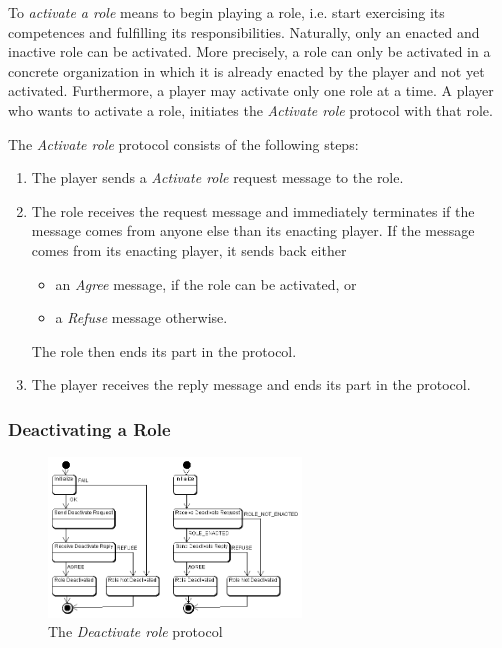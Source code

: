 To \textit{activate a role} means to begin playing a role, i.e. start exercising its competences and fulfilling its responsibilities.
Naturally, only an enacted and inactive role can be activated.
More precisely, a role can only be activated in a concrete organization in which it is already enacted by the player and not yet activated.
Furthermore, a player may activate only one role at a time.
A player who wants to activate a role, initiates the \textit{Activate role} protocol with that role.

The \textit{Activate role} protocol consists of the following steps:
\begin{enumerate}
	\item The player sends a \textit{Activate role} request message to the role.
	\item The role receives the request message and immediately terminates if the message comes from anyone else than its enacting player.
	If the message comes from its enacting player, it sends back either
	\begin{itemize}
		\item an \textit{Agree} message, if the role can be activated, or
		\item a \textit{Refuse} message otherwise.
	\end{itemize}
	The role then ends its part in the protocol.
	\item The player receives the reply message and ends its part in the protocol.
\end{enumerate}

\subsubsection{Deactivating a Role}

\begin{figure}[ht]
	\centering
	\includegraphics[width=0.6\textwidth]{images/thespian/deactivate-role-protocol}
	\caption{The \textit{Deactivate role} protocol}
	\label{figure:thespian-deactivate-role-protocol}
\end{figure}


